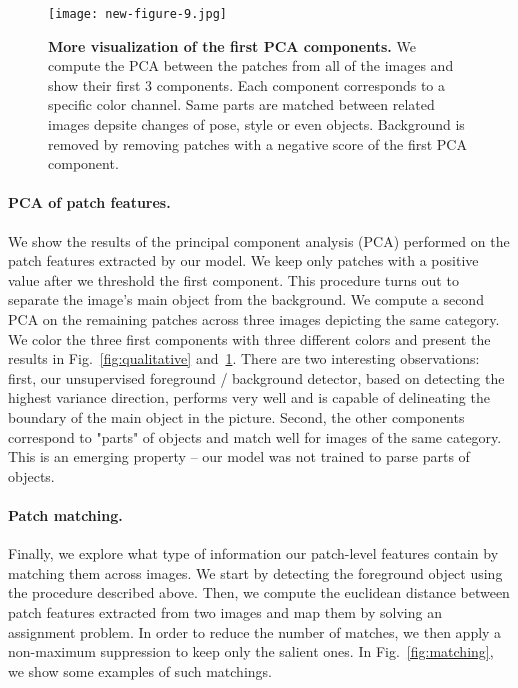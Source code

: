 \begin{figure}[t]
  \centering
  \texttt{[image: new-figure-9.jpg]}
  \caption{
    \textbf{More visualization of the first PCA components.} 
    We compute the PCA between the patches from all of the images and show their first 3 components.
    Each component corresponds to a specific color channel. Same parts are matched between related images depsite changes of pose, style or even objects.
    Background is removed by removing patches with a negative score of the first PCA component.
  }
  \label{fig:pca}
\end{figure}


\paragraph{PCA of patch features.}
We show the results of the principal component analysis (PCA) performed on the patch features extracted by our model.
We keep only patches with a positive value after we threshold the first component.
This procedure turns out to separate the image's main object from the background.
We compute a second PCA on the remaining patches across three images depicting the same category.
We color the three first components with three different colors and present the results in Fig.~\ref{fig:qualitative} and~\ref{fig:pca}.
There are two interesting observations:
first, our unsupervised foreground / background detector, based on detecting the highest variance direction, performs very well and is capable of delineating the boundary of the main object in the picture.
Second, the other components correspond to "parts" of objects and match well for images of the same category.
This is an emerging property -- our model was not trained to parse parts of objects.

\paragraph{Patch matching.}
Finally, we explore what type of information our patch-level features contain by matching them across images. 
We start by detecting the foreground object using the procedure described above.
Then, we compute the euclidean distance between patch features extracted from two images and map them by solving an assignment problem.
In order to reduce the number of matches, we then apply a non-maximum suppression to keep only the salient ones.
In Fig.~\ref{fig:matching}, we show some examples of such matchings. 


